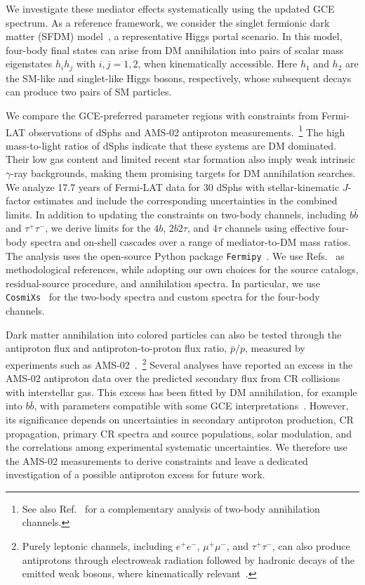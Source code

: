 \documentclass[superscriptaddress,
showpacs,preprintnumbers,nofootinbib,eqsecnum,amsmath,amssymb,aps,11pt, groupedaddress, floatfix]{revtex4-2}
\begin{document}
We investigate these mediator effects systematically using the
updated GCE spectrum.
As a reference framework, we consider the singlet
fermionic dark matter (SFDM)
model~\cite{Kim:2008pp,Kim:2009ke,Kim:2016csm},
a representative Higgs portal scenario.
In this model, four-body final states can arise from DM annihilation into pairs of scalar mass eigenstates $h_i h_j$
with $i,j=1,2$, when kinematically accessible.
Here $h_1$ and $h_2$ are the SM-like and singlet-like Higgs bosons,
respectively, whose subsequent decays can produce two pairs of
SM particles.

We compare the GCE-preferred parameter regions with constraints
from Fermi-LAT observations of dSphs and AMS-02 antiproton
measurements.~\footnote{See also Ref.~\cite{DiMauro:2021qcf}
for a complementary analysis of two-body annihilation channels.}
The high mass-to-light ratios of dSphs indicate that these systems
are DM dominated. 
Their low gas content and limited recent star
formation also imply weak intrinsic $\gamma$-ray backgrounds,
making them promising targets for DM annihilation searches.
We analyze 17.7 years of Fermi-LAT data for 30 dSphs with
stellar-kinematic $J$-factor estimates and include the
corresponding uncertainties in the combined limits.
In addition to updating the constraints on two-body channels,
including $b\bar b$ and $\tau^+\tau^-$, we derive limits for
the $4b$, $2b2\tau$, and $4\tau$ channels using effective
four-body spectra and on-shell cascades over a range of
mediator-to-DM mass ratios.
The analysis uses the open-source Python package
\texttt{Fermipy}~\cite{Wood:2017yyb}.
We use Refs.~\cite{McDaniel:2023bju,Circiello:2026inp}
as methodological references, while adopting our own choices
for the source catalogs, residual-source procedure, and
annihilation spectra.
In particular, we use \texttt{CosmiXs}~\cite{Arina:2023eic}
for the two-body spectra and custom spectra for the four-body
channels.

Dark matter annihilation into colored particles can also be tested through the antiproton flux and antiproton-to-proton flux ratio,
$\bar p/p$, measured by experiments such as
AMS-02~\cite{AMS:2021nhj}.~\footnote{Purely leptonic channels,
including $e^+e^-$, $\mu^+\mu^-$, and $\tau^+\tau^-$, can also
produce antiprotons through electroweak radiation followed by
hadronic decays of the emitted weak bosons, where kinematically
relevant~\cite{Garny:2011cj}.}
Several analyses have reported an excess in the AMS-02 antiproton
data over the predicted secondary flux from CR collisions with
interstellar gas.
This excess has been fitted by DM annihilation, for example into
$b\bar b$, with parameters compatible with some GCE
interpretations~\cite{Cuoco:2016eej,Cui:2016ppb}.
However, its significance depends on uncertainties in secondary antiproton production, CR propagation, primary CR spectra and source populations, solar modulation, and the correlations among
experimental systematic uncertainties.
We therefore use the AMS-02 measurements to derive constraints
and leave a dedicated investigation of a possible antiproton
excess for future work.
\end{document}
